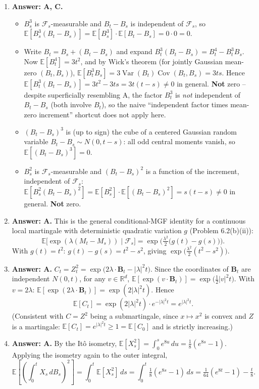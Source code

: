 \documentclass[11pt]{article}
\newcommand{\R}{\mathbb{R}}
\newcommand{\E}{\mathbb{E}}
\DeclareMathOperator{\Var}{Var}
\DeclareMathOperator{\Cov}{Cov}
\newcommand{\ans}[1]{\par\noindent\textbf{\color{blue!50!black}Answer: #1}}
\begin{document}
\begin{enumerate}
\item[\textbf{Q11.}] \ans{A, C.}
\begin{itemize}[nosep]
\item[A] $B_s^3$ is $\mathcal F_s$-measurable and $B_t-B_s$ is independent of $\mathcal F_s$, so $\E[B_s^3(B_t-B_s)]=\E[B_s^3]\cdot\E[B_t-B_s]=0\cdot0=0$.
\item[B] Write $B_t=B_s+(B_t-B_s)$ and expand $B_t^3(B_t-B_s)=B_t^4-B_t^3B_s$. Now $\E[B_t^4]=3t^2$, and by Wick's theorem (for jointly Gaussian mean-zero $(B_t,B_s)$), $\E[B_t^3B_s]=3\Var(B_t)\Cov(B_t,B_s)=3ts$. Hence $\E[B_t^3(B_t-B_s)]=3t^2-3ts=3t(t-s)\ne0$ in general. \textbf{Not} zero -- despite superficially resembling A, the factor $B_t^3$ is \emph{not} independent of $B_t-B_s$ (both involve $B_t$), so the naive ``independent factor times mean-zero increment'' shortcut does not apply here.
\item[C] $(B_t-B_s)^3$ is (up to sign) the cube of a centered Gaussian random variable $B_t-B_s\sim N(0,t-s)$: all odd central moments vanish, so $\E[(B_t-B_s)^3]=0$.
\item[D] $B_s^2$ is $\mathcal F_s$-measurable and $(B_t-B_s)^2$ is a function of the increment, independent of $\mathcal F_s$: $\E[B_s^2(B_t-B_s)^2]=\E[B_s^2]\cdot\E[(B_t-B_s)^2]=s(t-s)\ne0$ in general. \textbf{Not} zero.
\end{itemize}

\item[\textbf{Q12.}] \ans{A.} This is the general conditional-MGF identity for a continuous local martingale with deterministic quadratic variation $g$ (Problem 6.2(b)(ii)):
\[
\E\big[\exp(\lambda(M_t-M_s))\mid\mathcal F_s\big]=\exp\Big(\tfrac{\lambda^2}2\big(g(t)-g(s)\big)\Big).
\]
With $g(t)=t^2$: $g(t)-g(s)=t^2-s^2$, giving $\exp\big(\tfrac{\lambda^2}2(t^2-s^2)\big)$.

\item[\textbf{Q13.}] \ans{A.} $C_t=Z_t^2=\exp\big(2\lambda\cdot\boldsymbol B_t-|\lambda|^2t\big)$. Since the coordinates of $\boldsymbol B_t$ are independent $N(0,t)$, for any $v\in\R^d$, $\E[\exp(v\cdot\boldsymbol B_t)]=\exp\big(\tfrac12|v|^2t\big)$. With $v=2\lambda$: $\E[\exp(2\lambda\cdot\boldsymbol B_t)]=\exp(2|\lambda|^2t)$. Hence
\[
\E[C_t]=\exp(2|\lambda|^2t)\cdot e^{-|\lambda|^2t}=e^{|\lambda|^2t}.
\]
(Consistent with $C=Z^2$ being a submartingale, since $x\mapsto x^2$ is convex and $Z$ is a martingale: $\E[C_t]=e^{|\lambda|^2t}\ge1=\E[C_0]$ and is strictly increasing.)

\item[\textbf{Q14.}] \ans{A.} By the It\^o isometry, $\E[X_s^2]=\int_0^se^{8u}\,du=\tfrac18(e^{8s}-1)$. Applying the isometry again to the outer integral,
\[
\E\left[\left(\int_0^tX_s\,dB_s\right)^2\right]=\int_0^t\E[X_s^2]\,ds=\int_0^t\tfrac18(e^{8s}-1)\,ds=\tfrac1{64}(e^{8t}-1)-\tfrac t8.
\]


\end{enumerate}
\end{document}
